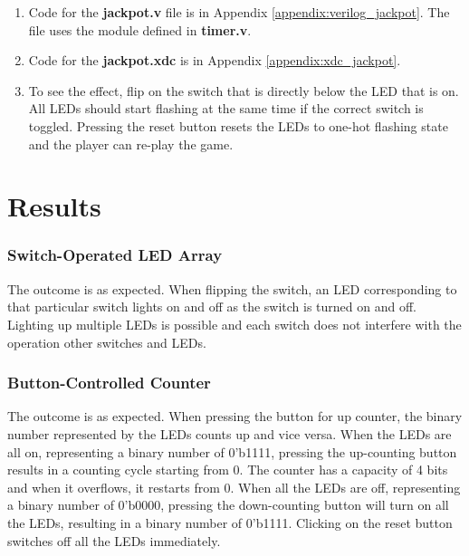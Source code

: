\documentclass[11pt,letterpaper,titlepage]{article}
\begin{document}
\begin{enumerate}
    \item Code for the \textbf{jackpot.v} file is in Appendix \ref{appendix:verilog_jackpot}. The file uses the module defined in \textbf{timer.v}.
    
    \item Code for the \textbf{jackpot.xdc} is in Appendix \ref{appendix:xdc_jackpot}.
    
    
    \item To see the effect, flip on the switch that is directly below the LED that is on. All LEDs should start flashing at the same time if the correct switch is toggled. Pressing the reset button resets the LEDs to one-hot flashing state and the player can re-play the game.
    
    
\end{enumerate}

\newpage

\part{Results}

\section{Switch-Operated LED Array}

The outcome is as expected. When flipping the switch, an LED corresponding to that particular switch lights on and off as the switch is turned on and off. Lighting up multiple LEDs is possible and each switch does not interfere with the operation other switches and LEDs.


\section{Button-Controlled Counter}



The outcome is as expected. When pressing the button for up counter, the binary number represented by the LEDs counts up and vice versa. When the LEDs are all on, representing a binary number of 0'b1111, pressing the up-counting button results in a counting cycle starting from 0. The counter has a capacity of 4 bits and when it overflows, it restarts from 0. When all the LEDs are off, representing a binary number of 0'b0000, pressing the down-counting button will turn on all the LEDs, resulting in a binary number of 0'b1111. Clicking on the reset button switches off all the LEDs immediately.
\end{document}
